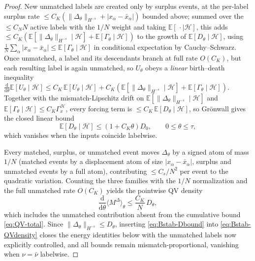\documentclass[a4paper,fleqn]{cas-sc}
\theoremstyle{definition}
\theoremstyle{remark}
\begin{document}
\begin{proof}
New unmatched labels are created only by surplus events, at the per-label surplus rate
$\le C_K(\|\Delta_\theta\|_{H^{-s}}+|x_\alpha-\bar x_\alpha|)$ bounded above; summed over
the $\le C_NN$ active labels with the $1/N$ weight and taking
$\mathbb E[\,\cdot\mid\mathcal H]$, this adds
$\le C_K(\mathbb E[\|\Delta_\theta\|_{H^{-s}}\mid\mathcal H]+\mathbb E[\Gamma_\theta\mid\mathcal H])$
to the growth of $\mathbb E[D_\theta\mid\mathcal H]$, using
$\frac1N\sum_\alpha|x_\alpha-\bar x_\alpha|\le\mathbb E[\Gamma_\theta\mid\mathcal H]$ in
conditional expectation by Cauchy--Schwarz. Once unmatched, a label and its descendants
branch at full rate $O(C_K)$, but each resulting label is again unmatched, so $U_\theta$
obeys a \emph{linear} birth--death inequality
$\frac{\mathrm d}{\mathrm d\theta}\mathbb E[U_\theta\mid\mathcal H]
\le C_K\,\mathbb E[U_\theta\mid\mathcal H]+C_K(\mathbb E[\|\Delta_\theta\|_{H^{-s}}\mid\mathcal H]+\mathbb E[\Gamma_\theta\mid\mathcal H])$.
Together with the mismatch-Lipschitz drift on $\mathbb E[\|\Delta_\theta\|_{H^{-s}}\mid\mathcal H]$
and $\mathbb E[\Gamma_\theta\mid\mathcal H]\le C_K\Gamma_x^{\mathcal H}$, every forcing
term is $\le C_K\,\mathbb E[D_\theta\mid\mathcal H]$, so Gr\"onwall gives the closed linear
bound
\begin{equation}\label{eq:Bstab-Dbound}
\mathbb E[D_\theta\mid\mathcal H]\le(1+C_K\theta)D_0,\qquad 0\le\theta\le\tau,
\end{equation}
which vanishes when the inputs coincide labelwise.

Every matched, surplus, or unmatched event moves $\Delta_\theta$ by a signed atom of
mass $1/N$ (matched events by a displacement atom of size $|x_\alpha-\bar x_\alpha|$,
surplus and unmatched events by a full atom), contributing $\le C_s/N^2$ per event to
the quadratic variation. Counting the three families with the $1/N$ normalization and
the full unmatched rate $O(C_K)$ yields the pointwise QV density
\begin{equation}\label{eq:Bstab-QVdensity}
\frac{\mathrm d}{\mathrm d\theta}\langle M^\Delta\rangle_\theta\le\frac{C_K}{N}\,D_\theta,
\end{equation}
which includes the unmatched contribution absent from the cumulative bound
\eqref{eq:QV-total}. Since $\|\Delta_\theta\|_{H^{-s}}\le D_\theta$, inserting
\eqref{eq:Bstab-Dbound} into \eqref{eq:Bstab-QVdensity} closes the energy identities
below with the unmatched labels now explicitly controlled, and all bounds remain
mismatch-proportional, vanishing when $\nu=\bar\nu$ labelwise.


\end{proof}
\end{document}
